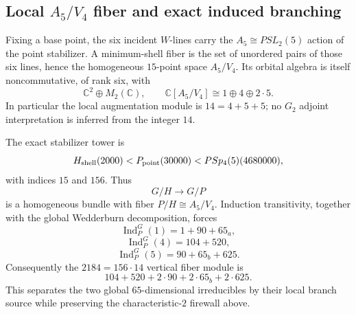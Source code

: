 \subsection{Local $A_5/V_4$ fiber and exact induced branching}

Fixing a base point, the six incident $W$-lines carry the $A_5\cong PSL_2(5)$
action of the point stabilizer.  A minimum-shell fiber is the set of unordered
pairs of those six lines, hence the homogeneous $15$-point space $A_5/V_4$.
Its orbital algebra is itself noncommutative, of rank six, with
\[
 \mathbb C^2\oplus M_2(\mathbb C),
 \qquad
 \mathbb C[A_5/V_4]\cong 1\oplus4\oplus2\cdot5.
\]
In particular the local augmentation module is $14=4+5+5$; no $G_2$ adjoint
interpretation is inferred from the integer $14$.

The exact stabilizer tower is
\[
 H_{\rm shell}(2000)<P_{\rm point}(30000)<PSp_4(5)(4680000),
\]
with indices $15$ and $156$.  Thus
\[
 G/H\longrightarrow G/P
\]
is a homogeneous bundle with fiber $P/H\cong A_5/V_4$.  Induction transitivity,
together with the global Wedderburn decomposition, forces
\[
 \boxed{\operatorname{Ind}_P^G(1)=1+90+65_a,}
\]
\[
 \boxed{\operatorname{Ind}_P^G(4)=104+520,}
\]
\[
 \boxed{\operatorname{Ind}_P^G(5)=90+65_b+625.}
\]
Consequently the $2184=156\cdot14$ vertical fiber module is
\[
 104+520+2\cdot90+2\cdot65_b+2\cdot625.
\]
This separates the two global $65$-dimensional irreducibles by their local branch
source while preserving the characteristic-$2$ firewall above.
